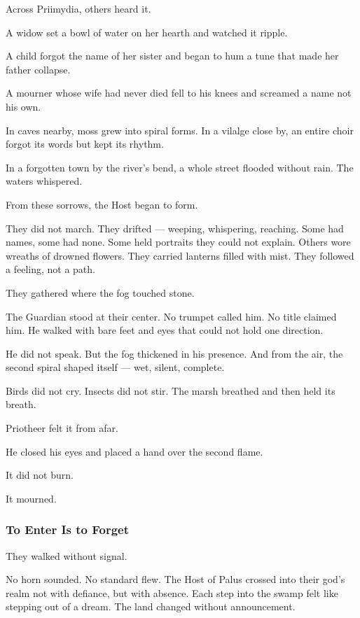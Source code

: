 \documentclass[12pt]{article}
\begin{document}
Across Priimydia, others heard it.

A widow set a bowl of water on her hearth and watched it ripple.

A child forgot the name of her sister and began to hum a tune that made her father collapse.

A mourner whose wife had never died fell to his knees and screamed a name not his own.

In caves nearby, moss grew into spiral forms. In a vilalge close by, an entire choir forgot its words but kept its rhythm.

In a forgotten town by the river’s bend, a whole street flooded without rain. The waters whispered.

From these sorrows, the Host began to form.

They did not march. They drifted — weeping, whispering, reaching. Some had names, some had none. Some held portraits they could not explain. Others wore wreaths of drowned flowers. They carried lanterns filled with mist. They followed a feeling, not a path.

They gathered where the fog touched stone.

The Guardian stood at their center. No trumpet called him. No title claimed him. He walked with bare feet and eyes that could not hold one direction.

He did not speak. But the fog thickened in his presence. And from the air, the second spiral shaped itself — wet, silent, complete.

Birds did not cry. Insects did not stir. The marsh breathed and then held its breath.

Priotheer felt it from afar.

He closed his eyes and placed a hand over the second flame.

It did not burn.

It mourned.

\dotfill

\subsubsection*{To Enter Is to Forget}

They walked without signal.

No horn sounded. No standard flew. The Host of Palus crossed into their god’s realm not with defiance, but with absence. Each step into the swamp felt like stepping out of a dream. The land changed without announcement.
\end{document}
